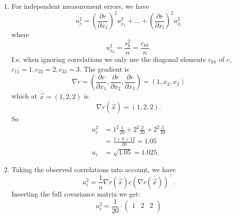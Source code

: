     \begin{derivation}
      \begin{enumerate}[label=\alph*)]
        \item For independent measurement errors, we have
          \begin{equation*}
            u_{\overline{r}}^2 = \left( \frac{\partial r}{\partial x_1}  \right)^2 u_{\overline{x}_1}^2 + \ldots + \left( \frac{\partial r}{\partial x_l}  \right)^2 u_{\overline{x}_l}^2
          \end{equation*}
          where
          \begin{equation*}
            u^2_{\overline{x}_k} = \frac{s_k^2}{n} = \frac{c_{kk}}{n}
          .\end{equation*}
          I.e. when ignoring correlations we only use the diagonal elements $c_{kk}$ of $c$, $c_{11} = 1, c_{22} = 2, c_{33} = 3$.
          The gradient is
          \begin{equation*}
            \nabla  r = \left( \frac{\partial r}{\partial x_1} , \frac{\partial r}{\partial x_2} , \frac{\partial r}{\partial x_3}  \right) = (1, x_3, x_2)
          \end{equation*}
          which at $\overline{\Vec{x}} = (1,2,2)$ is
          \begin{equation*}
            \nabla r \left( \overline{\Vec{x}} \right) = (1,2,2)
          .\end{equation*}
          So
          \begin{align*}
            u_{\overline{r}}^2 &= 1^2 \frac{1}{20} + 2^2 \frac{2}{20} + 2^2 \frac{3}{20} \\
            &= \frac{1 + 8 + 12}{20} = \num{1,05}  \\
            u_{\overline{r}} &= \sqrt{\num{1,05}} = \num{1,025} 
          .\end{align*}
        \item Taking the observed correlations into account, we have
          \begin{equation*}
            u_{\overline{r}}^2 = \frac{1}{n} \nabla r \left( \overline{\Vec{x}} \right) c \left( \nabla  r \left( \overline{\Vec{x}} \right) \right)^{\intercal}
          .\end{equation*}
          Inserting the full covariance matrix we get:
          \begin{equation*}
            u_{\overline{r}}^2 = \frac{1}{20} \cdot \begin{pmatrix}
              1 & 2 & 2\\

\end{pmatrix}
\end{equation*}
\end{enumerate}
\end{derivation}
